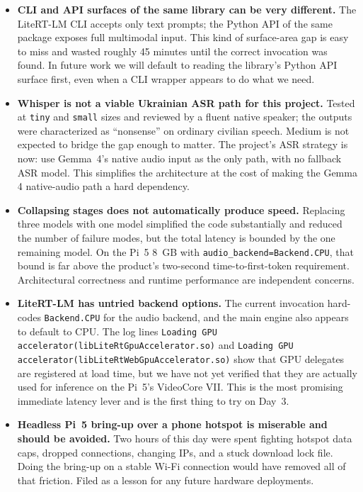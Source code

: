 \documentclass{article}
\theoremstyle{plain}
\theoremstyle{definition}
\theoremstyle{remark}
\begin{document}
\begin{itemize}
\item \textbf{CLI and API surfaces of the same library can be very different.} The LiteRT-LM CLI accepts only text prompts; the Python API of the same package exposes full multimodal input. This kind of surface-area gap is easy to miss and wasted roughly 45 minutes until the correct invocation was found. In future work we will default to reading the library's Python API surface first, even when a CLI wrapper appears to do what we need.
\item \textbf{Whisper is not a viable Ukrainian ASR path for this project.} Tested at \texttt{tiny} and \texttt{small} sizes and reviewed by a fluent native speaker; the outputs were characterized as ``nonsense'' on ordinary civilian speech. Medium is not expected to bridge the gap enough to matter. The project's ASR strategy is now: use Gemma~4's native audio input as the only path, with no fallback ASR model. This simplifies the architecture at the cost of making the Gemma 4 native-audio path a hard dependency.
\item \textbf{Collapsing stages does not automatically produce speed.} Replacing three models with one model simplified the code substantially and reduced the number of failure modes, but the total latency is bounded by the one remaining model. On the Pi~5 8~GB with \texttt{audio\_backend=Backend.CPU}, that bound is far above the product's two-second time-to-first-token requirement. Architectural correctness and runtime performance are independent concerns.
\item \textbf{LiteRT-LM has untried backend options.} The current invocation hard-codes \texttt{Backend.CPU} for the audio backend, and the main engine also appears to default to CPU. The log lines \texttt{Loading GPU accelerator(libLiteRtGpuAccelerator.so)} and \texttt{Loading GPU accelerator(libLiteRtWebGpuAccelerator.so)} show that GPU delegates are registered at load time, but we have not yet verified that they are actually used for inference on the Pi~5's VideoCore VII. This is the most promising immediate latency lever and is the first thing to try on Day~3.
\item \textbf{Headless Pi~5 bring-up over a phone hotspot is miserable and should be avoided.} Two hours of this day were spent fighting hotspot data caps, dropped connections, changing IPs, and a stuck download lock file. Doing the bring-up on a stable Wi-Fi connection would have removed all of that friction. Filed as a lesson for any future hardware deployments.

\end{itemize}
\end{document}
